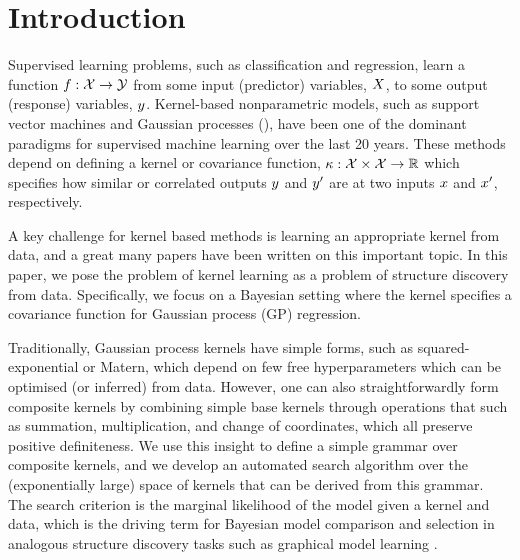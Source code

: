 \documentclass[twoside]{article}
\begin{document}
\section{Introduction}

Supervised learning problems, such as classification and regression, learn a function ${f : \mathcal{X} \to \mathcal{Y}}$ from some input (predictor) variables, $X$, to some output (response) variables, $y$.
Kernel-based nonparametric models, such as support vector machines and Gaussian processes (\gp{}), have been one of the dominant paradigms for supervised machine learning over the last 20 years.
These methods depend on defining a kernel or covariance function, $\kappa : \mathcal{X} \times \mathcal{X} \to \mathbb{R}$ which specifies how similar or correlated outputs $y$ and $y'$ are at two inputs $x$ and $x'$, respectively.

A key challenge for kernel based methods is learning an appropriate kernel from data, and a great many papers have been written on this important topic. 
In this paper, we pose the problem of kernel learning as a problem of structure discovery from data.
Specifically, we focus on a Bayesian setting where the kernel specifies a covariance function for Gaussian process (GP) regression. 

Traditionally, Gaussian process kernels have simple forms, such as squared-exponential or Matern, which depend on few free hyperparameters which can be optimised (or inferred) from data.
However, one can also straightforwardly form composite kernels by combining simple base kernels through operations that such as summation, multiplication, and change of coordinates, which all preserve positive definiteness.
We use this insight to define a simple grammar over composite kernels, and we develop an automated search algorithm over the (exponentially large) space of kernels that can be derived from this grammar.
The search criterion is the marginal likelihood of the model given a kernel and data, which is the driving term for Bayesian model comparison and selection in analogous structure discovery tasks such as graphical model learning \cite{heckerman1995learning}.
\end{document}
